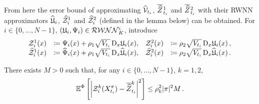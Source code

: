 From here the error bound of approximating $\widehat{\mathcal{V}}_{t_i}$, $\overline{\widehat{Z}}\kern0.1em^{1}_{t_{i}}$ and $\overline{\widehat{Z}}\kern0.1em^{2}_{t_{i}}$ with their RWNN approximators $\widehat{\mathfrak{U}}_i$, $\widehat{\mathcal{Z}}^1_{i}$ and $\widehat{\mathcal{Z}}^2_{i}$ 
(defined in the lemma below)
can be obtained.
For $i\in\{0,\dots,N-1\}$, $(\mathfrak{U}_i, \Psi_i)\in\mathcal{RWNN}^{\varsigma}_K$, 
introduce
\begin{equation*}
\begin{array}{rlrl}
\mathcal{Z}^1_{i}(x) &\coloneqq \Psi_i(x)+\rho_1\sqrt{V_{t_i}}\,\mathrm{D}_{x}\mathfrak{U}_i(x), & 
\mathcal{Z}^2_{i}(x) &\coloneqq \rho_2\sqrt{V_{t_i}}\,\mathrm{D}_{x}\mathfrak{U}_i(x)\,,\\
\widehat{\mathcal{Z}}^1_{i}(x) &\coloneqq \widehat\Psi_i(x)+\rho_1\sqrt{V_{t_i}}\,\mathrm{D}_{x}\widehat{\mathfrak{U}}_i(x), & 
\widehat{\mathcal{Z}}^2_{i}(x) &\coloneqq \rho_2\sqrt{V_{t_i}}\,\mathrm{D}_{x}\widehat{\mathfrak{U}}_i(x)\,.
\end{array}
\end{equation*}

\begin{lemma}\label{lem:approxError}
There exists $M>0$ such that,
for any $i\in\{0,\dots,N-1\}$, $k=1,2$,
$$
\mathbb{E}^\Phi\left[
\left|\mathcal{Z}_i^k(X^\pi_{t_i}) - \overline{\widehat{Z}}^{k}_{t_{i}}\right|^2\right] \leq\rho_k^2|\pi|^2 M\,.
$$
\end{lemma}

